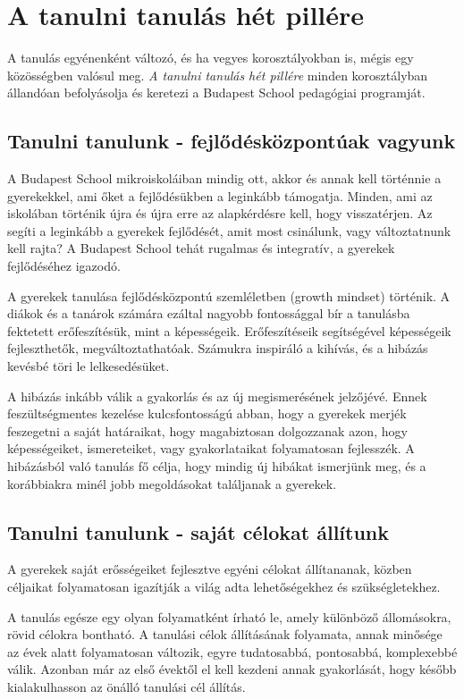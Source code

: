\section{A tanulni tanulás hét pillére}
A tanulás egyénenként változó, és ha vegyes korosztályokban is, mégis egy
közösségben valósul meg. \emph{A tanulni tanulás hét pillére} minden
korosztályban
állandóan befolyásolja és keretezi a Budapest School pedagógiai programját.

\subsection{Tanulni tanulunk - fejlődésközpontúak vagyunk}
A Budapest School mikroiskoláiban mindig ott, akkor és annak kell történnie a
gyerekekkel, ami őket a fejlődésükben a leginkább támogatja. Minden, ami az
iskolában történik újra és újra erre az alapkérdésre kell, hogy visszatérjen.
Az segíti a leginkább a gyerekek fejlődését, amit most csinálunk, vagy
változtatnunk kell rajta? A Budapest School tehát rugalmas és integratív, a
gyerekek fejlődéséhez igazodó.

A gyerekek tanulása fejlődésközpontú szemléletben (growth mindset) történik. A
diákok és a tanárok számára ezáltal nagyobb fontossággal bír a tanulásba
fektetett erőfeszítésük, mint a képességeik. Erőfeszítéseik segítségével
képességeik fejleszthetők, megváltoztathatóak. Számukra inspiráló a kihívás, és
a hibázás kevésbé töri le lelkesedésüket.

A hibázás inkább válik a gyakorlás és az új megismerésének jelzőjévé. Ennek
feszültségmentes kezelése kulcsfontosságú abban, hogy a gyerekek merjék
feszegetni a saját határaikat, hogy magabiztosan dolgozzanak azon, hogy
képességeiket, ismereteiket, vagy gyakorlataikat folyamatosan fejlesszék. A
hibázásból való tanulás fő célja, hogy mindig új hibákat ismerjünk meg, és a
korábbiakra minél jobb megoldásokat találjanak a gyerekek.

\subsection{Tanulni tanulunk - saját célokat állítunk}
A gyerekek saját erősségeiket fejlesztve egyéni célokat állítananak, közben
céljaikat folyamatosan igazítják a világ adta lehetőségekhez és
szükségletekhez.

A tanulás egésze egy olyan folyamatként írható le, amely különböző állomásokra,
rövid célokra bontható. A tanulási célok állításának folyamata, annak minősége
az évek alatt folyamatosan változik, egyre tudatosabbá, pontosabbá, komplexebbé
válik. Azonban már az első évektől el kell kezdeni annak gyakorlását, hogy
később kialakulhasson az önálló tanulási cél állítás.

